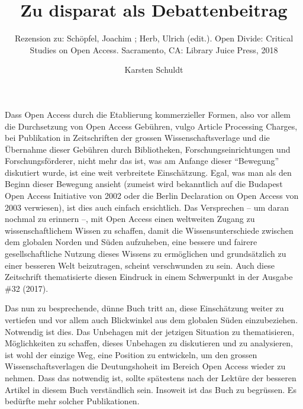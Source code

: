 \documentclass[a4paper,
fontsize=11pt,
oneside,
numbers=noperiodatend,
parskip=half-,
bibliography=totoc,
final
]{scrartcl}
\title{\LARGE{Zu disparat als Debattenbeitrag}}%
\subtitle{Rezension zu: Schöpfel, Joachim ; Herb, Ulrich (edit.). Open Divide: Critical Studies on Open Access. Sacramento, CA: Library Juice Press, 2018}
\author{Karsten Schuldt} %
\date{}
\begin{document}
\maketitle
\thispagestyle{fancyplain} 


Dass Open Access durch die Etablierung kommerzieller Formen, also vor
allem die Durchsetzung von Open Access Gebühren, vulgo Article
Processing Charges, bei Publikation in Zeitschriften der grossen
Wissenschaftsverlage und die Übernahme dieser Gebühren durch
Bibliotheken, Forschungseinrichtungen und Forschungsförderer, nicht mehr
das ist, was am Anfange dieser \enquote{Bewegung} diskutiert wurde, ist
eine weit verbreitete Einschätzung. Egal, was man als den Beginn dieser
Bewegung ansieht (zumeist wird bekanntlich auf die Budapest Open Access
Initiative von 2002 oder die Berlin Declaration on Open Access von 2003
verwiesen), ist dies auch einfach ersichtlich. Das Versprechen -- um
daran nochmal zu erinnern --, mit Open Access einen weltweiten Zugang zu
wissenschaftlichem Wissen zu schaffen, damit die Wissensunterschiede
zwischen dem globalen Norden und Süden aufzuheben, eine bessere und
fairere gesellschaftliche Nutzung dieses Wissens zu ermöglichen und
grundsätzlich zu einer besseren Welt beizutragen, scheint verschwunden
zu sein. Auch diese Zeitschrift thematisierte diesen Eindruck in einem
Schwerpunkt in der Ausgabe \#32 (2017).

Das nun zu besprechende, dünne Buch tritt an, diese Einschätzung weiter
zu vertiefen und vor allem auch Blickwinkel aus dem globalen Süden
einzubeziehen. Notwendig ist dies. Das Unbehagen mit der jetzigen
Situation zu thematisieren, Möglichkeiten zu schaffen, dieses Unbehagen
zu diskutieren und zu analysieren, ist wohl der einzige Weg, eine
Position zu entwickeln, um den grossen Wissenschaftsverlagen die
Deutungshoheit im Bereich Open Access wieder zu nehmen. Dass das
notwendig ist, sollte spätestens nach der Lektüre der besseren Artikel
in diesem Buch verständlich sein. Insoweit ist das Buch zu begrüssen. Es
bedürfte mehr solcher Publikationen.
\end{document}
